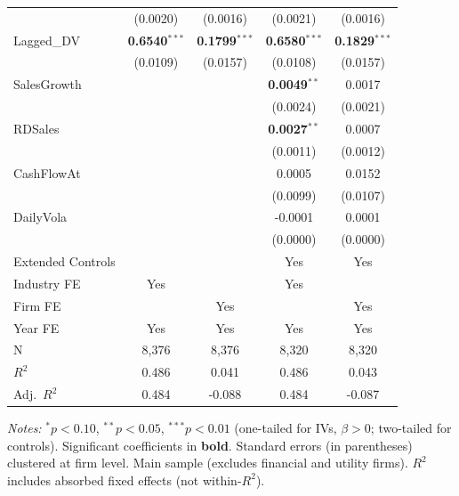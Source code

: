 \begin{landscape}
\begin{table}[H]
\begin{tabular}{lcccc}
 & (0.0020) & (0.0016) & (0.0021) & (0.0016) \\
Lagged\_DV & \textbf{0.6540}$^{***}$ & \textbf{0.1799}$^{***}$ & \textbf{0.6580}$^{***}$ & \textbf{0.1829}$^{***}$ \\
 & (0.0109) & (0.0157) & (0.0108) & (0.0157) \\
SalesGrowth &  &  & \textbf{0.0049}$^{**}$ & 0.0017 \\
 &  &  & (0.0024) & (0.0021) \\
RDSales &  &  & \textbf{0.0027}$^{**}$ & 0.0007 \\
 &  &  & (0.0011) & (0.0012) \\
CashFlowAt &  &  & 0.0005 & 0.0152 \\
 &  &  & (0.0099) & (0.0107) \\
DailyVola &  &  & -0.0001 & 0.0001 \\
 &  &  & (0.0000) & (0.0000) \\
\midrule
Extended Controls &  &  & Yes & Yes \\
Industry FE & Yes &  & Yes &  \\
Firm FE &  & Yes &  & Yes \\
Year FE & Yes & Yes & Yes & Yes \\
\midrule
N & 8,376 & 8,376 & 8,320 & 8,320 \\
$R^2$ & 0.486 & 0.041 & 0.486 & 0.043 \\
Adj.~$R^2$ & 0.484 & -0.088 & 0.484 & -0.087 \\
\bottomrule
\end{tabular}
\begin{minipage}{\linewidth}
\vspace{2pt}\scriptsize
\textit{Notes:} $^{*}p<0.10$, $^{**}p<0.05$, $^{***}p<0.01$ (one-tailed for IVs, $\beta > 0$; two-tailed for controls).
 Significant coefficients in \textbf{bold}.
 Standard errors (in parentheses) clustered at firm level.
 Main sample (excludes financial and utility firms).
 $R^2$ includes absorbed fixed effects (not within-$R^2$).
\end{minipage}
\end{table}
\end{landscape}